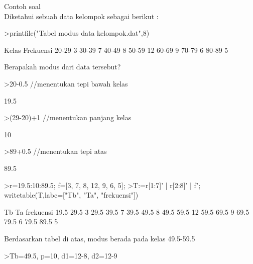\documentclass[a4paper,10pt]{article}
\begin{document}
\begin{eulernotebook}
\begin{eulercomment}
\begin{eulercomment}
\begin{eulercomment}
\begin{eulercomment}
\begin{eulercomment}
\begin{eulercomment}
\begin{eulercomment}
\begin{eulercomment}
\begin{eulercomment}
\begin{eulercomment}
\begin{eulercomment}
\begin{eulercomment}
\begin{eulercomment}
Contoh soal\\
Diketahui sebuah data kelompok sebagai berikut :
\end{eulercomment}
\begin{eulerprompt}
>printfile("Tabel modus data kelompok.dat",8) 
\end{eulerprompt}
\begin{euleroutput}
        Kelas     Frekuensi
        20-29         3
        30-39         7
        40-49         8
        50-59         12
        60-69         9
        70-79         6
        80-89         5
\end{euleroutput}
\begin{eulercomment}
Berapakah modus dari data tersebut?
\end{eulercomment}
\begin{eulerprompt}
>20-0.5  //menentukan tepi bawah kelas
\end{eulerprompt}
\begin{euleroutput}
  19.5
\end{euleroutput}
\begin{eulerprompt}
>(29-20)+1 //menentukan panjang kelas
\end{eulerprompt}
\begin{euleroutput}
  10
\end{euleroutput}
\begin{eulerprompt}
>89+0.5 //menentukan tepi atas
\end{eulerprompt}
\begin{euleroutput}
  89.5
\end{euleroutput}
\begin{eulerprompt}
>r=19.5:10:89.5; f=[3, 7, 8, 12, 9, 6, 5];
>T:=r[1:7]' | r[2:8]' | f'; writetable(T,labc=["Tb", "Ta", "frekuensi"])
\end{eulerprompt}
\begin{euleroutput}
          Tb        Ta frekuensi
        19.5      29.5         3
        29.5      39.5         7
        39.5      49.5         8
        49.5      59.5        12
        59.5      69.5         9
        69.5      79.5         6
        79.5      89.5         5
\end{euleroutput}
\begin{eulercomment}
Berdasarkan tabel di atas, modus berada pada kelas 49.5-59.5
\end{eulercomment}
\begin{eulerprompt}
>Tb=49.5, p=10, d1=12-8, d2=12-9
\end{eulerprompt}
\begin{euleroutput}

\end{euleroutput}
\end{eulercomment}
\end{eulercomment}
\end{eulercomment}
\end{eulercomment}
\end{eulercomment}
\end{eulercomment}
\end{eulercomment}
\end{eulercomment}
\end{eulercomment}
\end{eulercomment}
\end{eulercomment}
\end{eulercomment}
\end{eulernotebook}
\end{document}
